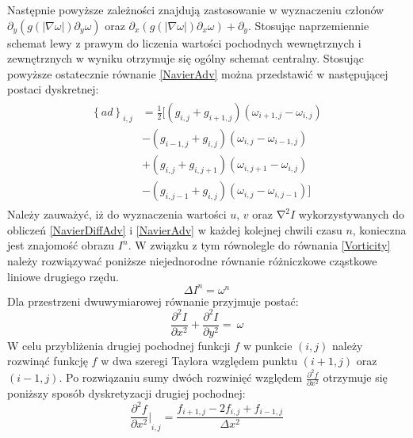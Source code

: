 \documentclass[12pt, twoside, openany]{report}
\theoremstyle{definition}
\begin{document}
Następnie powyższe zależności znajdują zastosowanie w wyznaczeniu członów\\ ${\partial }_y\left(g\left(\left|\nabla \omega \right|\right){\partial }_y\omega \right)$ oraz ${\partial }_x\left(g\left(\left|\nabla \omega \right|\right){\partial }_x\omega \right)+{\partial }_y$. Stosując naprzemiennie schemat lewy z prawym do liczenia wartości pochodnych wewnętrznych i zewnętrznych w wyniku otrzymuje się ogólny schemat centralny. Stosując powyższe ostatecznie równanie \eqref{NavierAdv} można przedstawić w następującej postaci dyskretnej:
\begin{align}
\begin{aligned}
{\left\{ad\right\}}_{i,j}
&= \frac{1}{2}\biggl[\left(g_{i,j}+g_{i+1,j}\right)\left({\omega }_{i+1,j}-{\omega }_{i,j}\right) \\[1ex]
&- \left(g_{i-1,j}+g_{i,j}\right)\left({\omega }_{i,j}-{\omega }_{i-1,j}\right)   \\[1ex]
&+ \left(g_{i,j}+g_{i,j+1}\right)\left({\omega }_{i,j+1}-{\omega }_{i,j}\right) \\[1ex]
&- \left(g_{i,j-1}+g_{i,j}\right)\left({\omega }_{i,j}-{\omega }_{i,j-1}\right)\biggl]
\end{aligned}
\label{discreteAnisotropic2}
\end{align}
Należy zauważyć, iż do wyznaczenia wartości $u$, $v$ oraz ${\mathrm{\nabla }}^2I$ wykorzystywanych do obliczeń \eqref{NavierDiffAdv} i \eqref{NavierAdv} w każdej kolejnej chwili czasu $n$, konieczna jest znajomość obrazu $I^n$. W związku z tym równolegle do równania \eqref{Vorticity} należy rozwiązywać poniższe niejednorodne równanie różniczkowe cząstkowe liniowe drugiego rzędu.
\begin{equation}
\Delta I^n={\omega }^n
\label{Poisson}
\end{equation}
Dla przestrzeni dwuwymiarowej równanie przyjmuje postać:
\begin{equation}
\frac{{\partial }^2I}{\partial x^2}+\frac{{\partial }^2I}{\partial y^2}=\ \omega
\label{Poisson2D}
\end{equation}
W celu przybliżenia drugiej pochodnej funkcji $f$ w punkcie $(i,j)$ należy rozwinąć funkcję $f$ w dwa szeregi Taylora względem punktu $(i+1,j)$ oraz $(i-1,j)$. Po rozwiązaniu sumy dwóch rozwinięć względem $\frac{{\partial }^2f}{\partial x^2}$ otrzymuje się poniższy sposób dyskretyzacji drugiej pochodnej:
\begin{equation}
{\frac{{\partial }^2f}{\partial x^2}\mathrm{|}}_{i,j}\mathrm{=}\frac{f_{i+1,j}-2f_{i,j}+f_{i-1,j}}{\Delta x^2}
\label{d2fdx2}
\end{equation}
\end{document}
